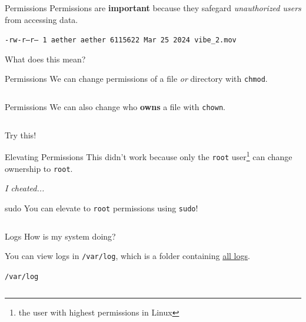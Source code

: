 \documentclass{beamer}
\begin{document}
\begin{frame}{Permissions}
	Permissions are \textbf{important} because they safegard
	\textit{unauthorized users} from accessing data.
	\pause

	\vspace{0.3cm}

	\texttt{-rw-r--r-- 1 aether aether  6115622 Mar 25  2024 vibe\_2.mov}

	What does this mean?
\end{frame}

\begin{frame}{Permissions}
	We can change permissions of a file \textit{or} directory with \texttt{chmod}.
	\pause

	\tiny\inputminted{shell-session}{chmod.txt}
\end{frame}

\begin{frame}{Permissions}
	We can also change who \textbf{owns} a file with \texttt{chown}.
	\pause

	\tiny\inputminted{shell-session}{chown.txt}
	\pause

	\begin{center}
		\Large Try this!
	\end{center}
\end{frame}

\begin{frame}{Elevating Permissions}
	This didn't work because only the \texttt{root} user\footnote{the user
	with highest permissions in Linux} can change ownership to
	\texttt{root}.
	\pause

	\vspace{0.3cm}

	\textit{I cheated...}
	\pause

	\begin{exampleblock}{sudo}
		You can elevate to \texttt{root} permissions using
		\texttt{sudo}!
		\inputminted{shell-session}{sudo.txt}
	\end{exampleblock}
\end{frame}

\begin{frame}{Logs}
	\pause
	How is my system doing?
	\pause

	You can view logs in \texttt{/var/log}, which is a folder containing
	\underline{all logs}.
	\pause

	\begin{exampleblock}{\texttt{/var/log}}
		\tiny\inputminted{shell-session}{varlog.txt}
	\end{exampleblock}
\end{frame}
\end{document}
